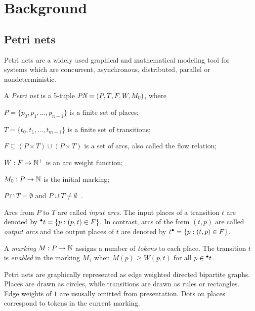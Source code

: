 \chapter{Background}
\label{chap:background}

\section{Petri nets}

Petri nets are a widely used graphical and mathematical modeling tool
for systems which are concurrent, asynchronous, distributed, parallel
or nondeterministic.

\begin{dfn}
  A \emph{Petri net} is a 5-tuple $\textit{PN} = (P, T, F, W, M_0)$, where
  \begin{asparaitem}
  \item $P = \{p_0, p_1, \ldots, p_{n - 1}\}$ is a finite set of places;
  \item $T = \{t_0, t_1, \ldots, t_{m - 1}\}$ is a finite set of transitions;
  \item $F \subseteq (P \times T) \cup (P \times T)$ is a set of
    arcs, also called the flow relation;
  \item $W: F \to \mathbb{N}^{+}$ is an arc weight function;
  \item $M_0: P \to \mathbb{N}$ is the initial marking;
  \item $P \cap T = \emptyset$ and $P \cup T \neq
    \emptyset$~\citep{murata1989petri}.
  \end{asparaitem}
\end{dfn}

Arcs from $P$ to $T$ are called \emph{input arcs}. The input places of
a transition $t$ are denoted by $\prescript{\bullet}{}{t} = \{ p : (p, t) \in F
\}$.
In contrast, arcs of the form $(t, p)$ are called \emph{output arcs}
and the output places of $t$ are denoted by
$t^\bullet = \{p : (t, p) \in F \}$.

A \emph{marking} $M: P \to \mathbb{N}$ assigns a number of \emph{tokens} to each
place. The transition $t$ is \emph{enabled} in the marking $M_1$
 when $M(p) \ge W(p, t)$ for all $p \in
\prescript{\bullet}{}{t}$.

Petri nets are graphically represented as edge weighted directed
bipartite graphs. Places are drawn as circles, while transitions are
drawn as rules or rectangles. Edge weights of $1$ are ususally omitted
from presentation. Dots on places correspond to tokens in the current
marking.

